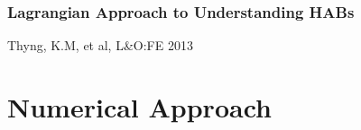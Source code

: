 \documentclass[ignorenonframetext]{beamer}
\begin{document}
\begin{frame}
	\frametitle{Lagrangian Approach to Understanding HABs}
	\begin{figure}[htbp]
		\centering
	\end{figure}
	{\tiny Thyng, K.M, et al, L\&O:FE 2013}
\end{frame}



\section{Numerical Approach}


\end{document}
